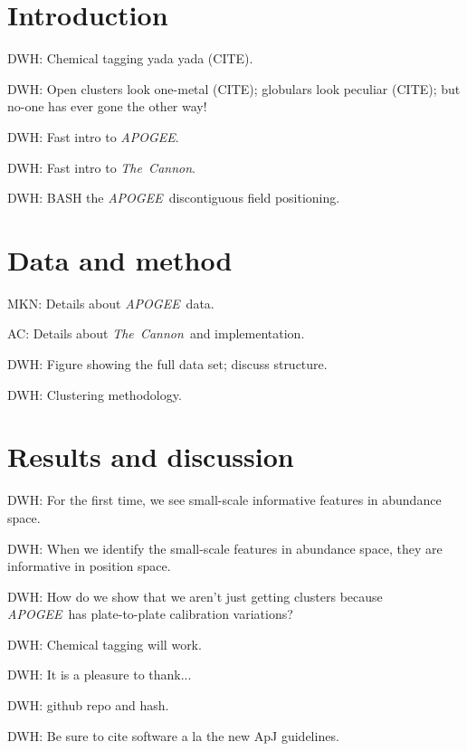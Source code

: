 \documentclass[12pt, letterpaper, preprint]{aastex}
\newcommand{\acronym}[1]{{\small{#1}}}
\newcommand{\project}[1]{\textsl{#1}}
\newcommand{\apogee}{\acronym{\project{APOGEE}}}
\newcommand{\thecannon}{\project{The~Cannon}}
\begin{document}
\section{Introduction}

DWH: Chemical tagging yada yada (CITE).

DWH: Open clusters look one-metal (CITE); globulars look peculiar (CITE); but no-one has ever gone the other way! 

DWH: Fast intro to \apogee.

DWH: Fast intro to \thecannon.

DWH: BASH the \apogee\ discontiguous field positioning.

\section{Data and method}

MKN: Details about \apogee\ data.

AC: Details about \thecannon\ and implementation.

DWH: Figure showing the full data set; discuss structure.

DWH: Clustering methodology.

\section{Results and discussion}

DWH: For the first time, we see small-scale informative features in abundance space.

DWH: When we identify the small-scale features in abundance space, they are informative in position space.

DWH: How do we show that we aren't just getting clusters because \apogee\ has plate-to-plate calibration variations?

DWH: Chemical tagging will work.

\acknowledgements
DWH: It is a pleasure to thank...

DWH: github repo and hash.

DWH: Be sure to cite software a la the new ApJ guidelines.
\end{document}
